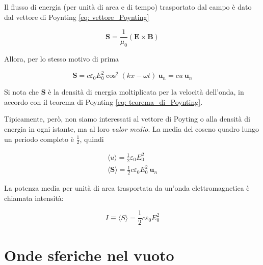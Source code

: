 Il flusso di energia (per unità di area e di tempo) trasportato dal campo è dato dal vettore di Poynting \eqref{eq: vettore_Poynting}

\begin{equation}
    \mathbf{S} = \frac{1}{\mu_0} (\mathbf{E} \times \mathbf{B})
\end{equation}

Allora, per lo stesso motivo di prima

\begin{tcolorbox}[colback=yellow!10!white, colframe=orange!70!black, boxrule=0.8pt]
\begin{equation}
    \mathbf{S} = c \varepsilon_0 E_0^2 \cos^2(kx - \omega t) \ \mathbf{u}_n = c u \ \mathbf{u}_n
\end{equation}
\end{tcolorbox}

Si nota che $\mathbf{S}$ è la densità di energia moltiplicata per la velocità dell'onda, in accordo con il teorema di Poynting \eqref{eq: teorema_di_Poynting}.

Tipicamente, però, non siamo interessati al vettore di Poyting o alla densità di energia in ogni istante, ma al loro \emph{valor medio}. La media del coseno quadro lungo un periodo completo è $\frac{1}{2}$, quindi 

\begin{tcolorbox}[colback=yellow!10!white, colframe=orange!70!black, boxrule=0.8pt]
\begin{align}
    \langle u \rangle = \frac{1}{2}\varepsilon_0 E_0^2 \\
    \langle \mathbf{S} \rangle = \frac{1}{2} c \varepsilon_0 E_0^2 \ \mathbf{u}_n
\end{align}
\end{tcolorbox}

La potenza media per unità di area trasportata da un'onda elettromagnetica è chiamata intensità: 

\begin{tcolorbox}[colback=yellow!10!white, colframe=orange!70!black, boxrule=0.8pt]
\begin{equation}
    I \equiv \langle S \rangle = \frac{1}{2} c \varepsilon_0 E_0^2
\end{equation}
\end{tcolorbox}

\newpage

\section{Onde sferiche nel vuoto}

